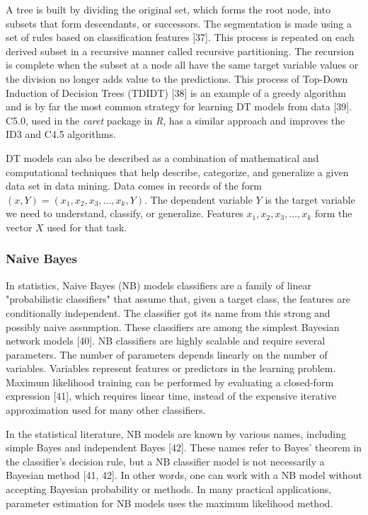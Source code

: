 \documentclass[sn-mathphys-num]{sn-jnl}%
\begin{document}
A tree is built by dividing the original set, which forms the root node, into subsets that form descendants, or successors. The segmentation is made using a set of rules based on classification features [37]. This process is repeated on each derived subset in a recursive manner called recursive partitioning. The recursion is complete when the subset at a node all have the same target variable values or the division no longer adds value to the predictions. This process of Top-Down Induction of Decision Trees (TDIDT) [38] is an example of a greedy algorithm and is by far the most common strategy for learning DT models from data [39]. C5.0, used in the \textit{caret} package in \textit{R}, has a similar approach and improves the ID3 and C4.5 algorithms.

DT models can also be described as a combination of mathematical and computational techniques that help describe, categorize, and generalize a given data set in data mining. Data comes in records of the form $(x, Y) = (x_{1}, x_{2}, x_{3}, \ldots, x_{k}, Y)$. The dependent variable $Y$ is the target variable we need to understand, classify, or generalize. Features $x_{1}, x_{2}, x_{3}, \ldots, x_{k}$ form the vector $X$ used for that task.

\subsubsection{Naive Bayes}

In statistics, Naive Bayes (NB) models classifiers are a family of linear "probabilistic classifiers" that assume that, given a target class, the features are conditionally independent. The classifier got its name from this strong and possibly naive assumption. These classifiers are among the simplest Bayesian network models [40]. NB classifiers are highly scalable and require several parameters. The number of parameters depends linearly on the number of variables. Variables represent features or predictors in the learning problem. Maximum likelihood training can be performed by evaluating a closed-form expression [41], which requires linear time, instead of the expensive iterative approximation used for many other classifiers.

In the statistical literature, NB models are known by various names, including simple Bayes and independent Bayes [42]. These names refer to Bayes' theorem in the classifier's decision rule, but a NB classifier model is not necessarily a Bayesian method [41, 42]. In other words, one can work with a NB model without accepting Bayesian probability or methods. In many practical applications, parameter estimation for NB models uses the maximum likelihood method.
\end{document}
